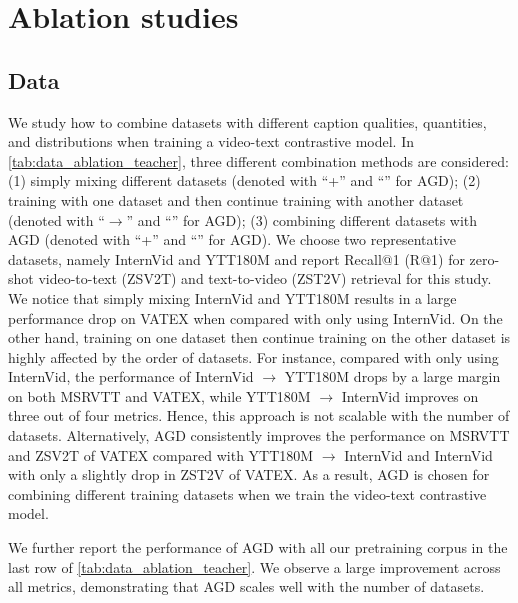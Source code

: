 \documentclass{article}
\theoremstyle{plain}
\theoremstyle{definition}
\theoremstyle{remark}
\newcommand{\cmark}{\ding{51}}
\newcommand{\xmark}{\ding{55}}
\begin{document}
%
 \section{Ablation studies}\label{app:ablation}

\subsection{Data}
We study how to combine datasets with different caption qualities, quantities, and distributions when training a video-text contrastive model.
In \cref{tab:data_ablation_teacher}, three different combination methods are considered:
(1) simply mixing different datasets (denoted with ``+'' and ``\xmark'' for AGD);
(2) training with one dataset and then continue training with another dataset (denoted with ``$\rightarrow$'' and ``\xmark'' for AGD);
(3) combining different datasets with AGD (denoted with ``+'' and ``\cmark'' for AGD).
We choose two representative datasets, namely InternVid \cite{wang2023internvid} and YTT180M \cite{zellers2021merlot} and report Recall@1 (R@1) for zero-shot video-to-text (ZSV2T) and text-to-video (ZST2V) retrieval for this study.
We notice that simply mixing InternVid and YTT180M results in a large performance drop on VATEX when compared with only using InternVid.
On the other hand, training on one dataset then continue training on the other dataset is highly affected by the order of datasets.
For instance, compared with only using InternVid, the performance of InternVid $\rightarrow$ YTT180M drops by a large margin on both MSRVTT and VATEX, while YTT180M $\rightarrow$ InternVid improves on three out of four metrics.
Hence, this approach is not scalable with the number of datasets.
Alternatively, AGD consistently improves the performance on MSRVTT and ZSV2T of VATEX compared with YTT180M $\rightarrow$ InternVid and InternVid with only a slightly drop in ZST2V of VATEX.
As a result, AGD is chosen for combining different training datasets when we train the video-text contrastive model.

We further report the performance of AGD with all our pretraining corpus in the last row of \cref{tab:data_ablation_teacher}.
We observe a large improvement across all metrics, demonstrating that AGD scales well with the number of datasets.
\end{document}
